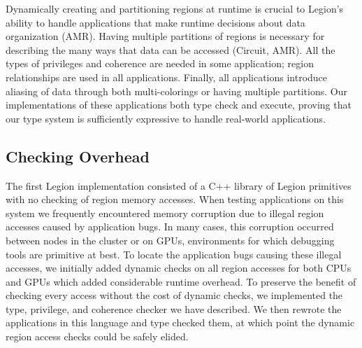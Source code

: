 Dynamically creating and partitioning regions at runtime is crucial to Legion's
ability to handle applications that make runtime decisions about data organization (AMR).  
Having multiple partitions of regions is necessary for describing the many ways 
that data can be accessed (Circuit, AMR).  All the types of privileges and coherence 
are needed in some application;  region relationships
are used in all applications.   Finally, all applications introduce aliasing of
data through both multi-colorings or having multiple partitions.  Our implementations of
these applications both type check and execute, proving that our type system is
sufficiently expressive to handle real-world applications.

\subsection{Checking Overhead}
\label{subsec:overhead}
The first Legion implementation consisted of a C++ library of Legion primitives
\cite{Legion12} with no checking of region memory accesses.  
When testing applications on this system we frequently encountered memory corruption due to
illegal region accesses caused by application bugs.
In many cases, this corruption occurred between nodes in the cluster or on 
GPUs, environments for which debugging tools are primitive at best.
To locate the application bugs causing these illegal accesses, we initially added 
dynamic checks on  all region accesses for both CPUs and GPUs which  
added considerable runtime overhead.  
To preserve the benefit of checking every access without the cost of dynamic checks, we implemented the type, privilege, and coherence checker we have described. 
We then rewrote the applications in this language and type checked them, at which point the
dynamic region access checks could be safely elided.



